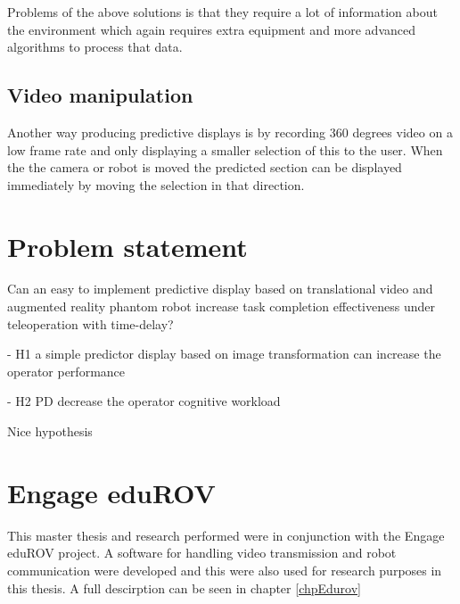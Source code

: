 Problems of the above solutions is that they require a lot of information about the environment which again requires extra equipment and more advanced algorithms to process that data.


\subsection{Video manipulation}

Another way producing predictive displays is by recording 360 degrees video on a low frame rate and only displaying a smaller selection of this to the user. When the the camera or robot is moved the predicted section can be displayed immediately by moving the selection in that direction. \citep{Baldwin1999}


\section{Problem statement}

Can an easy to implement predictive display based on translational video and augmented reality phantom robot increase task completion effectiveness under teleoperation with time-delay?

- H1 a simple predictor display based on image transformation can 
 increase the operator performance
 
- H2 PD decrease the operator cognitive workload
 
\citep{Lu2018} Nice hypothesis

\section{Engage eduROV}

This master thesis and research performed were in conjunction with the Engage eduROV project. A software for handling video transmission and robot communication were developed and this were also used for research purposes in this thesis. A full descirption can be seen in chapter \ref{chpEdurov}


